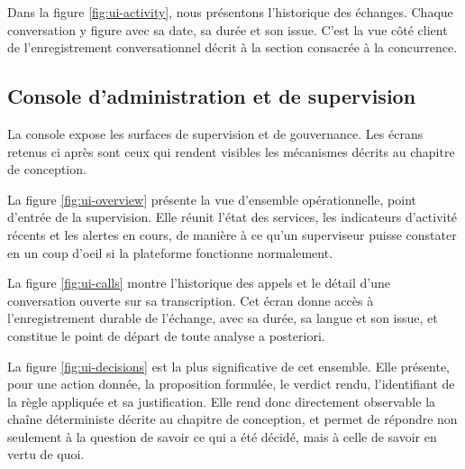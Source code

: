 
Dans la figure \ref{fig:ui-activity}, nous présentons l'historique des échanges. Chaque conversation y figure avec sa date, sa durée et son issue. C'est la vue côté client de l'enregistrement conversationnel décrit à la section consacrée à la concurrence.


\subsection{Console d'administration et de supervision}

La console expose les surfaces de supervision et de gouvernance. Les écrans retenus ci après sont ceux qui rendent visibles les mécanismes décrits au chapitre de conception.

La figure \ref{fig:ui-overview} présente la vue d'ensemble opérationnelle, point d'entrée de la supervision. Elle réunit l'état des services, les indicateurs d'activité récents et les alertes en cours, de manière à ce qu'un superviseur puisse constater en un coup d'oeil si la plateforme fonctionne normalement.


La figure \ref{fig:ui-calls} montre l'historique des appels et le détail d'une conversation ouverte sur sa transcription. Cet écran donne accès à l'enregistrement durable de l'échange, avec sa durée, sa langue et son issue, et constitue le point de départ de toute analyse a posteriori.


La figure \ref{fig:ui-decisions} est la plus significative de cet ensemble. Elle présente, pour une action donnée, la proposition formulée, le verdict rendu, l'identifiant de la règle appliquée et sa justification. Elle rend donc directement observable la chaîne déterministe décrite au chapitre de conception, et permet de répondre non seulement à la question de savoir ce qui a été décidé, mais à celle de savoir en vertu de quoi.


